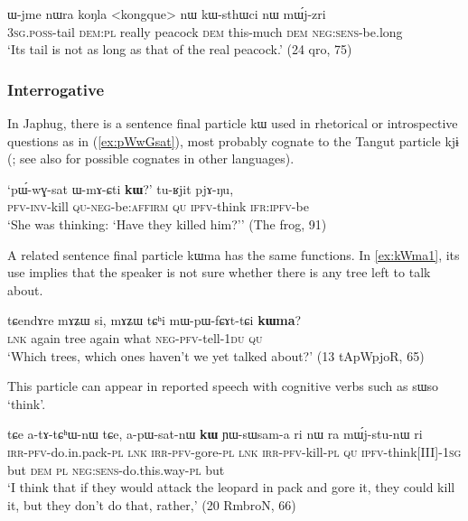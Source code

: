 \documentclass[oldfontcommands,oneside,a4paper,11pt]{article}
\newcommand{\ipa}[1]{{\phon #1}} %
\begin{document}
  \begin{exe}
\ex \label{ex:kWsthWci}
\gll 
 \ipa{ɯ-jme}  	\ipa{nɯra}  	\ipa{koŋla}  	<kongque> 	\ipa{nɯ}  	\ipa{kɯ-sthɯci}  	\ipa{nɯ}  	\ipa{mɯ́j-zri}  \\
\textsc{ 3sg.poss}-tail \textsc{dem:pl} really peacock \textsc{dem} this-much \textsc{dem} \textsc{neg:sens}-be.long \\
\glt `Its tail is not as long as that of the real peacock.' (24 qro, 75)
  \end{exe}
 
\subsubsection{Interrogative}
In Japhug, there is a sentence final particle \ipa{kɯ} used in rhetorical or  introspective questions as in  (\ref{ex:pWwGsat}), most probably cognate to the Tangut particle \ipa{kjɨ} (\citealt{jacques11tangut.verb}; see also \citealt{sunhk95yiwen} for possible cognates in other languages).
 
  \begin{exe} 
 \ex \label{ex:pWwGsat}
\gll 
`\ipa{pɯ́-wɣ-sat} 	\ipa{ɯ-mɤ-ɕti} 	\ipa{\textbf{kɯ}?}' 	\ipa{tu-ʁjit} 	\ipa{pjɤ-ŋu,} \\
\textsc{pfv-inv}-kill \textsc{qu-neg}-be:\textsc{affirm} \textsc{qu} \textsc{ipfv}-think \textsc{ifr:ipfv}-be \\
\glt `She was thinking: `Have they killed him?'' (The frog, 91)
 \end{exe}  
 
 A related sentence final particle \ipa{kɯma} has the same functions. In  \ref{ex:kWma1}, its use implies that the speaker is not sure whether there is any tree left to talk about.
 
   \begin{exe} 
 \ex \label{ex:kWma1}
\gll 
 \ipa{tɕendɤre} 	\ipa{mɤʑɯ} 	\ipa{si,} 	\ipa{mɤʑɯ} 	\ipa{tɕʰi} 	\ipa{mɯ-pɯ-fɕɤt-tɕi} 	\ipa{\textbf{kɯma}?} \\
\textsc{lnk} again tree again what \textsc{neg-pfv}-tell-\textsc{1du} \textsc{qu} \\
\glt `Which trees, which ones haven't we yet talked about?'  (13 tApWpjoR, 65)
  \end{exe} 

This particle can appear in reported speech with cognitive verbs such as \ipa{sɯso} `think'.

    \begin{exe} 
 \ex \label{ex:kW.YWsWsama}
\gll \ipa{a-kɤ-nɯtsʰɤβ-nɯ} 	\ipa{tɕe} 	\ipa{a-tɤ-tɕʰɯ-nɯ} 	\ipa{tɕe,} 	\ipa{a-pɯ-sat-nɯ} 	\ipa{\textbf{kɯ}} 	\ipa{ɲɯ-sɯsam-a} 	\ipa{ri}  \ipa{nɯ} \ipa{ra} 	\ipa{mɯ́j-stu-nɯ} 	\ipa{ri} \\
\textsc{irr-pfv}-do.in.pack-\textsc{pl} \textsc{lnk} \textsc{irr-pfv}-gore-\textsc{pl} \textsc{lnk } \textsc{irr-pfv}-kill-\textsc{pl} \textsc{qu} \textsc{ipfv}-think[III]-\textsc{1sg} but \textsc{dem} \textsc{pl} \textsc{neg:sens}-do.this.way-\textsc{pl}  but \\
\glt `I think that if they would attack the leopard in pack and gore it, they could kill it, but they don't do that, rather,' (20 RmbroN, 66)
 \end{exe} 
 
\end{document}
